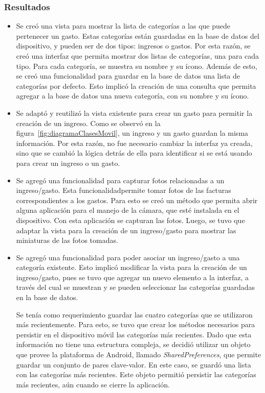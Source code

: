 \subsubsection{Resultados}
\begin{itemize}
\item Se creó una vista para mostrar la lista de categorías a las que puede pertenecer un gasto. Estas categorías están guardadas en la base de datos del dispositivo, y pueden ser de dos tipos: ingresos o gastos. Por esta razón, se creó una interfaz que permita mostrar dos listas de categorías, una para cada tipo. Para cada categoría, se muestra su nombre y su ícono. Además de esto, se creó una funcionalidad para guardar en la base de datos una lista de categorías por defecto. Esto implicó la creación de una consulta que permita agregar a la base de datos una nueva categoría, con su nombre y su ícono.
\item Se adaptó y reutilizó la vista existente para crear un gasto para permitir la creación de un ingreso. Como se observó en la figura~\ref{fig:diagramaClasesMovil}, un ingreso y un gasto guardan la misma información. Por esta razón, no fue necesario cambiar la interfaz ya creada, sino que se cambió la lógica detrás de ella para identificar si se está usando para crear un ingreso o un gasto.
\item Se agregó una funcionalidad para capturar fotos relacionadas a un ingreso/gasto. Esta funcionalidadpermite tomar fotos de las facturas correspondientes a los gastos. Para esto se creó un método que permita abrir alguna aplicación para el manejo de la cámara, que esté instalada en el dispositivo. Con esta aplicación se capturan las fotos. Luego, se tuvo que adaptar la vista para la creación de un ingreso/gasto para mostrar las miniaturas de las fotos tomadas.%
\item Se agregó una funcionalidad para poder asociar un ingreso/gasto a una categoría existente. Esto implicó modificar la vista para la creación de un ingreso/gasto, pues se tuvo que agregar un nuevo elemento a la interfaz, a través del cual se muestran y se pueden seleccionar las categorías guardadas en la base de datos.  

Se tenía como requerimiento guardar las cuatro categorías que se utilizaron más recientemente. Para esto, se tuvo que crear los métodos necesarios para persistir en el dispositivo móvil las categorías más recientes. Dado que esta información no tiene una estructura compleja, se decidió utilizar un objeto que provee la plataforma de Android, llamado \textit{SharedPreferences}, que permite guardar un conjunto de pares clave-valor. En este caso, se guardó una lista con las categorías más recientes. Este objeto permitió persistir las categorías más recientes, aún cuando se cierre la aplicación.

\end{itemize}

